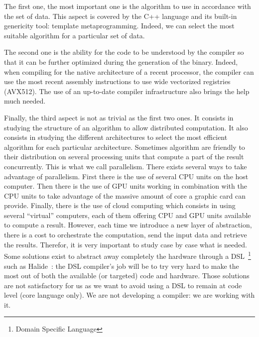 The first one, the most important one is the algorithm to use in accordance with the set of data. This aspect is covered
by the C++ language and its built-in genericity tool: template metaprogramming. Indeed, we can select the most suitable
algorithm for a particular set of data.

The second one is the ability for the code to be understood by the compiler so that it can be further optimized during
the generation of the binary. Indeed, when compiling for the native architecture of a recent processor, the compiler can
use the most recent assembly instructions to use wide vectorized registries (AVX512). The use of an up-to-date compiler
infrastructure also brings the help much needed.

Finally, the third aspect is not as trivial as the first two ones. It consists in studying the structure of an algorithm
to allow distributed computation. It also consists in studying the different architectures to select the most efficient
algorithm for each particular architecture. Sometimes algorithm are friendly to their distribution on several processing
units that compute a part of the result concurrently. This is what we call parallelism. There exists several ways to
take advantage of parallelism. First there is the use of several CPU units on the host computer. Then there is the use
of GPU units working in combination with the CPU units to take advantage of the massive amount of core a graphic card
can provide. Finally, there is the use of cloud computing which consists in using several ``virtual'' computers, each of
them offering CPU and GPU units available to compute a result. However, each time we introduce a new layer of
abstraction, there is a cost to orchestrate the computation, send the input data and retrieve the results. Therefor, it
is very important to study case by case what is needed. Some solutions exist to abstract away completely the hardware
through a DSL~\footnote{Domain Specific Language} such as Halide~\parencite{ragankelley.2013.halide}: the DSL compiler's
job will be to try very hard to make the most out of both the available (or targeted) code and hardware. Those solutions
are not satisfactory for us as we want to avoid using a DSL to remain at code level (core language only). We are not
developing a compiler: we are working with it.

